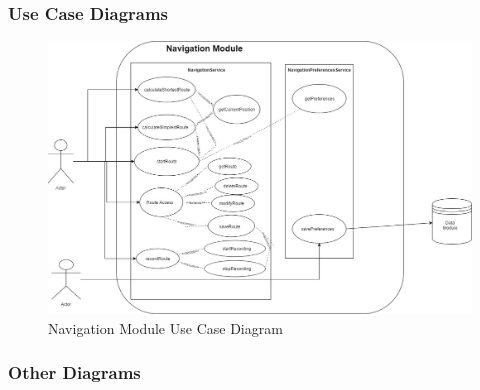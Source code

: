 \documentclass{article}
\begin{document}
        \subsubsection{Use Case Diagrams}
        \begin{figure}[H]
        	\includegraphics[width=\textwidth]{Navigation_Use_Case_Diagram}
            \caption{Navigation Module Use Case Diagram}
        \end{figure}
        \subsubsection{Other Diagrams}
\end{document}
